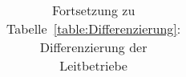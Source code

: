 \begin{table}[ht]
  \centering
  \caption{Fortsetzung zu Tabelle~\ref{table:Differenzierung}: Differenzierung der Leitbetriebe}
  \label{table:FortsetzungDifferenzierung}
  \begin{tabular}{|l|l|}
    \hline
			

\hline
  \end{tabular}
\end{table}
